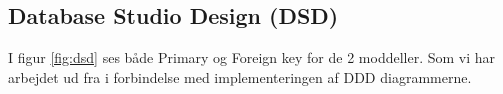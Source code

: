 


\subsection{Database Studio Design (DSD)}

I figur \ref{fig:dsd} ses både Primary og Foreign key for de 2 moddeller. Som vi har arbejdet ud fra i forbindelse med implementeringen af DDD diagrammerne.


